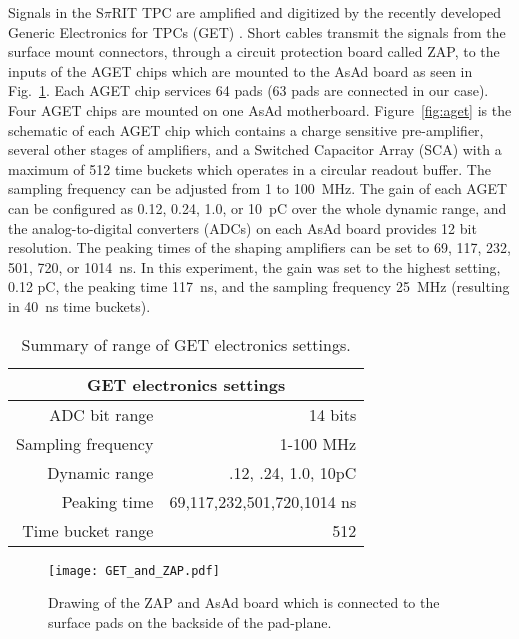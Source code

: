 Signals in the S$\pi$RIT TPC are amplified and digitized by the recently developed Generic Electronics for TPCs (GET) \cite{get}.  Short cables transmit the signals from the surface mount connectors, through a circuit protection board called ZAP, to the inputs of the AGET chips which are mounted to the AsAd board as seen in Fig.~\ref{fig:getzap}. Each AGET chip services 64 pads (63 pads are connected in our case). Four AGET chips are mounted on one AsAd  motherboard. Figure~\ref{fig:aget} is the schematic of each  AGET chip which contains a charge sensitive pre-amplifier, several other stages of amplifiers, and a Switched Capacitor Array (SCA) with a maximum of 512 time buckets which operates in a circular readout buffer. The sampling frequency can be adjusted from 1 to \SI{100}{\mega\hertz}. The gain of each AGET can be configured as 0.12, 0.24, 1.0, or \SI{10}{\pico\coulomb} over the whole dynamic range, and the analog-to-digital converters (ADCs) on each AsAd board provides 12 bit resolution. The peaking times of the shaping amplifiers can be set to 69, 117, 232, 501, 720, or \SI{1014}{\nano\second}. In this experiment, the gain was set to the highest setting, 0.12 \si{\pico\coulomb}, the peaking time \SI{117}{\nano\second}, and the sampling frequency \SI{25}{\mega\hertz} (resulting in \SI{40}{\nano\second} time buckets). 

\begin{table*}[!htb]
\centering
{}
\begin{tabular}{@{}rr@{}}\toprule 
\multicolumn{2}{c}{GET electronics settings}\\
\midrule
ADC bit range       & 14 bits \\
Sampling frequency  & 1-100 MHz \\
Dynamic range       & .12, .24, 1.0, 10pC \\
Peaking time        & 69,117,232,501,720,1014 ns \\
Time bucket range   & 512\\
\bottomrule
\end{tabular}
\caption{Summary of range of GET electronics settings. }
\label{tb:getoverview}
\end{table*}

\begin{figure}[!htb]
\centering
\texttt{[image: GET\_and\_ZAP.pdf]}
\caption{Drawing of the ZAP and AsAd board which is connected to the surface pads on the backside of the pad-plane.}
\label{fig:getzap}
\end{figure}



